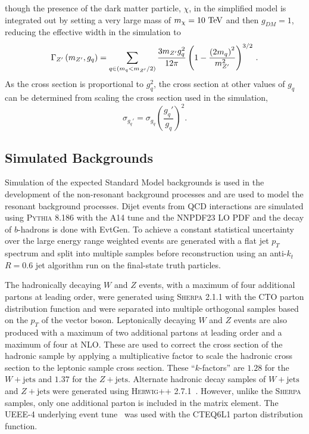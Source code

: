 though the presence of the dark matter particle, $\chi$, in the simplified model is integrated out by setting a very large mass of $m_{\chi} = 10~\mathrm{TeV}$ and then $g_{DM} = 1$, reducing the effective width in the simulation to
\[
 \Gamma_{Z'}\left(m_{Z'}, g_{q}\right) = \sum_{q \in \left(m_{q} < m_{Z'}/2\right)} \frac{3 m_{Z'} g_{q}^{2}}{12 \pi} \left(1 - \frac{\left(2m_{q}\right)^{2}}{m_{Z'}^{2}}\right)^{3/2}\,.
\]
As the cross section is proportional to $g_{q}^2$, the cross section at other values of $g_{q}$ can be determined from scaling the cross section used in the simulation,
\begin{equation}
 \sigma_{g_{q}'} = \sigma_{g_{q}} \left(\frac{g_{q}'}{g_{q}}\right)^{2}.
 \label{eq:g_q_scaling}
\end{equation}

\subsection{Simulated Backgrounds}\label{sec:simulation_background}

Simulation of the expected Standard Model backgrounds is used in the development of the non-resonant background processes and are used to model the resonant background processes.
Dijet events from QCD interactions are simulated using \textsc{Pythia 8.186} with the A14 tune and the NNPDF23 LO PDF and the decay of $b$-hadrons is done with EvtGen.
To achieve a constant statistical uncertainty over the large energy range weighted events are generated with a flat jet $p_{T}$ spectrum and split into multiple samples before reconstruction using an anti-$k_{t}$ $R=0.6$ jet algorithm run on the final-state truth particles.

The hadronically decaying $W$ and $Z$ events, with a maximum of four additional partons at leading order, were generated using \textsc{Sherpa} 2.1.1 with the CTO parton distribution function and were separated into multiple orthogonal samples based on the $p_{T}$ of the vector boson.
Leptonically decaying $W$ and $Z$ events are also produced with a maximum of two additional partons at leading order and a maximum of four at NLO.
These are used to correct the cross section of the hadronic sample by applying a multiplicative factor to scale the hadronic cross section to the leptonic sample cross section.
These ``$k$-factors'' are $1.28$ for the $W+\mathrm{jets}$ and $1.37$ for the $Z+\mathrm{jets}$.
Alternate hadronic decay samples of $W+\mathrm{jets}$ and $Z+\mathrm{jets}$ were generated using \textsc{Herwig++} 2.7.1~\cite{Bahr:2008pv}.
However, unlike the \textsc{Sherpa} samples, only one additional parton is included in the matrix element.
The UEEE-4 underlying event tune~\cite{Buckley:2018wdv} was used with the CTEQ6L1 parton distribution function.

